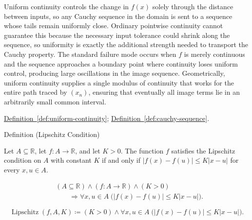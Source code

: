 \begin{remark*}[Interpretation]
Uniform continuity controls the change in $f(x)$ solely through the distance between inputs, so any Cauchy sequence in the domain is sent to a sequence whose tails remain uniformly close. Ordinary pointwise continuity cannot guarantee this because the necessary input tolerance could shrink along the sequence, so uniformity is exactly the additional strength needed to transport the Cauchy property. The standard failure mode occurs when $f$ is merely continuous and the sequence approaches a boundary point where continuity loses uniform control, producing large oscillations in the image sequence. Geometrically, uniform continuity supplies a single modulus of continuity that works for the entire path traced by $(x_n)$, ensuring that eventually all image terms lie in an arbitrarily small common interval.
\end{remark*}

\begin{dependencies}
\hyperref[def:uniform-continuity]{Definition~\ref{def:uniform-continuity}};
\hyperref[def:cauchy-sequence]{Definition~\ref{def:cauchy-sequence}}.
\end{dependencies}


\begin{definitionbox}{Definition (Lipschitz Condition)}
\begin{definition}
\label{def:lipschitz-condition}
Let $A \subseteq \mathbb{R}$, let $f:A \to \mathbb{R}$, and let $K>0$. The function $f$ satisfies the Lipschitz condition on $A$ with constant $K$ if and only if $|f(x)-f(u)| \le K|x-u|$ for every $x,u \in A$.
\end{definition}
\end{definitionbox}

\begin{remark*}
\[
\begin{aligned}
&(A\subseteq\mathbb{R})\land(f:A\to\mathbb{R})\land(K>0)\\
&\qquad\Longrightarrow
\forall x,u \in A\;\bigl(|f(x)-f(u)| \le K|x-u|\bigr).
\end{aligned}
\]
\end{remark*}

\begin{remark*}
\[
\operatorname{Lipschitz}(f,A,K) \coloneqq (K>0) \land \forall x,u \in A\;\bigl(|f(x)-f(u)| \le K|x-u|\bigr).
\]
\end{remark*}

